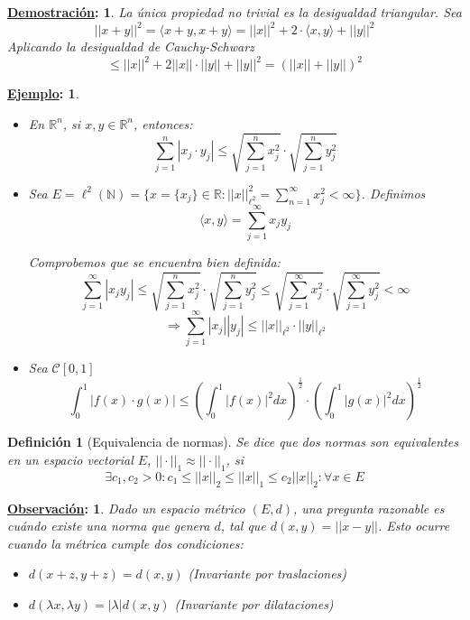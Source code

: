 \documentclass[10pt,a4paper,openright]{book}
\theoremstyle{break}
\newtheorem*{defi}{Definición}
\newtheorem*{demo}{\underline{Demostración}:}
\newtheorem*{obs}{\underline{Observación}:}
\newtheorem*{ej}{\underline{Ejemplo}:}
\begin{document}
\begin{demo}
La única propiedad no trivial es la desigualdad triangular. Sea 
$$|| x+y||^2 = \langle x+y,x+y\rangle = ||x||^2 + 2 \cdot \langle x,y\rangle + ||y||^2$$
Aplicando la desigualdad de Cauchy-Schwarz
$$\leq ||x||^2 + 2 ||x|| \cdot ||y|| + ||y||^2 = (||x|| + ||y||)^2$$
\end{demo}

\begin{ej}
\begin{itemize}
\item En $\mathbb{R}^n$, si $x,y \in \mathbb{R}^n$, entonces:
$$\sum_{j=1}^{n} |x_j \cdot y_j | \leq \sqrt{\sum_{j=1}^{n} x_j^2} \cdot\sqrt{\sum_{j=1}^{n} y_j^2} $$

\item Sea $E = \ell^2 (\mathbb{N}) = \{x= \{x_j\} \in \mathbb{R} : ||x||^2_{\ell^2} = \sum_{n=1}^{\infty} x_j^2 < \infty\}$. Definimos 
$$\langle x,y \rangle = \sum_{j=1}^{\infty} x_j y_j$$

Comprobemos que se encuentra bien definida:
$$\sum_{j=1}^{\infty} |x_j y_j | \leq \sqrt{\sum_{j=1}^{n} x_j^2} \cdot\sqrt{\sum_{j=1}^{n} y_j^2} \leq \sqrt{\sum_{j=1}^{\infty} x_j^2} \cdot\sqrt{\sum_{j=1}^{\infty} y_j^2}  < \infty $$
$$\Rightarrow\sum_{j=1}^{\infty} |x_j|| y_j | \leq ||x||_{\ell^2} \cdot ||y||_{\ell^2}$$

\item Sea $\mathcal{C}[0,1]$
$$\int_{0}^{1} |f(x) \cdot g(x)| \leq \left( \int_{0}^{1} |f(x)|^2 dx \right)^\frac{1}{2} \cdot \left( \int_{0}^{1} |g(x)|^2 dx \right)^\frac{1}{2} $$
\end{itemize}
\end{ej}

\begin{defi}[Equivalencia de normas]
Se dice que dos normas son equivalentes en un espacio vectorial $E$, $|| \cdot ||_1 \approx || \cdot ||_1$, si 
$$\exists c_1,c_2 > 0 : c_1 \leq ||x||_2 \leq ||x||_1 \leq c_2 ||x||_2 : \forall x \in E$$
\end{defi}

\begin{obs}
Dado un espacio métrico $(E,d)$, una pregunta razonable es cuándo existe una norma que genera $d$, tal que $d(x,y) = ||x-y||$. Esto ocurre cuando la métrica cumple dos condiciones:
\begin{itemize}
\item $d(x+z,y+z) = d(x,y)$ (Invariante por traslaciones)

\item $d(\lambda x, \lambda y) = |\lambda | d(x,y)$ (Invariante por dilataciones)
\end{itemize}
\end{obs}
\end{document}
